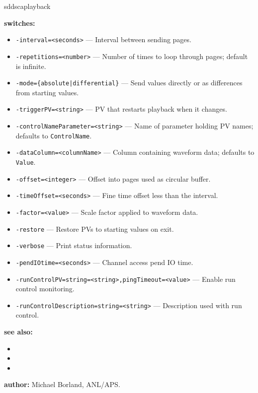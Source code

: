 \begin{sddsprog}{sddscaplayback}
\item \textbf{switches:}
\begin{itemize}
  \item {\tt -interval=<seconds>} --- Interval between sending pages.
  \item {\tt -repetitions=<number>} --- Number of times to loop through pages; default is infinite.
  \item {\tt -mode=\{absolute|differential\}} --- Send values directly or as differences from starting values.
  \item {\tt -triggerPV=<string>} --- PV that restarts playback when it changes.
  \item {\tt -controlNameParameter=<string>} --- Name of parameter holding PV names; defaults to {\tt ControlName}.
  \item {\tt -dataColumn=<columnName>} --- Column containing waveform data; defaults to {\tt Value}.
  \item {\tt -offset=<integer>} --- Offset into pages used as circular buffer.
  \item {\tt -timeOffset=<seconds>} --- Fine time offset less than the interval.
  \item {\tt -factor=<value>} --- Scale factor applied to waveform data.
  \item {\tt -restore} --- Restore PVs to starting values on exit.
  \item {\tt -verbose} --- Print status information.
  \item {\tt -pendIOtime=<seconds>} --- Channel access pend IO time.
  \item {\tt -runControlPV=string=<string>,pingTimeout=<value>} --- Enable run control monitoring.
  \item {\tt -runControlDescription=string=<string>} --- Description used with run control.
\end{itemize}

\item \textbf{see also:}
\begin{itemize}
  \item {}
  \item {}
  \item {}
\end{itemize}

\item \textbf{author:} Michael Borland, ANL/APS.
\end{sddsprog}
